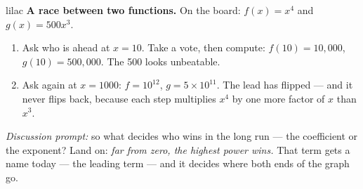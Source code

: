 \documentclass[10pt]{article}
\begin{document}
\begin{skillbox}{lilac}
    \textbf{A race between two functions.} On the board: $f(x) = x^4$ and $g(x) = 500x^3$.
    \begin{enumerate}[itemsep=2pt]
        \item Ask who is ahead at $x = 10$. Take a vote, then compute: $f(10) = 10{,}000$,
              $g(10) = 500{,}000$. The 500 looks unbeatable.
        \item Ask again at $x = 1000$: $f = 10^{12}$, $g = 5 \times 10^{11}$. The lead has
              flipped --- and it never flips back, because each step multiplies $x^4$ by one
              more factor of $x$ than $x^3$.
    \end{enumerate}
    \textit{Discussion prompt:} so what decides who wins in the long run --- the coefficient or
    the exponent? Land on: \emph{far from zero, the highest power wins.} That term gets a name
    today --- the leading term --- and it decides where both ends of the graph go.
\end{skillbox}
\end{document}
